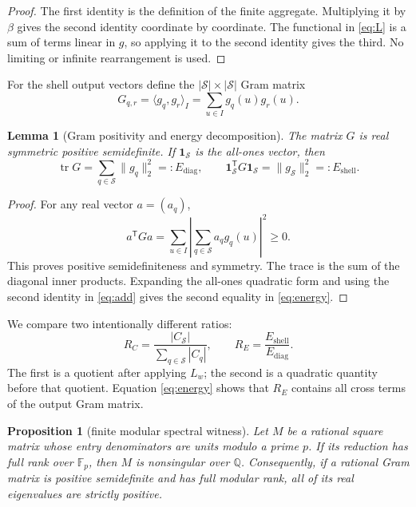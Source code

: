 \documentclass[11pt]{article}
\newtheorem{lemma}[theorem]{Lemma}
\newtheorem{proposition}[theorem]{Proposition}
\newcommand{\one}{\mathbf{1}}
\newcommand{\shell}{\mathcal S}
\newcommand{\Fp}{\mathbb F_p}
\begin{document}
\begin{proof}
The first identity is the definition of the finite aggregate.  Multiplying
it by $\beta$ gives the second identity coordinate by coordinate.  The
functional in \eqref{eq:L} is a sum of terms linear in $g$, so applying it to
the second identity gives the third.  No limiting or infinite rearrangement
is used.
\end{proof}

For the shell output vectors define the $|\shell|\times|\shell|$ Gram matrix
\begin{equation}
 G_{q,r}=\langle g_q,g_r\rangle_I
 =\sum_{u\in I}g_q(u)g_r(u).
 \label{eq:gram}
\end{equation}

\begin{lemma}[Gram positivity and energy decomposition]
The matrix $G$ is real symmetric positive semidefinite.  If $\one_{\shell}$
is the all-ones vector, then
\begin{equation}
 \operatorname{tr}G=\sum_{q\in\shell}\|g_q\|_2^2=:E_{\mathrm{diag}},
 \qquad
 \one_{\shell}^{\mathsf T}G\one_{\shell}
 =\|g_{\shell}\|_2^2=:E_{\mathrm{shell}}.
 \label{eq:energy}
\end{equation}
\end{lemma}

\begin{proof}
For any real vector $a=(a_q)$,
\begin{equation*}
 a^{\mathsf T}Ga
 =\sum_{u\in I}\left|\sum_{q\in\shell}a_qg_q(u)\right|^2\geq0.
\end{equation*}
This proves positive semidefiniteness and symmetry.  The trace is the sum of
the diagonal inner products.  Expanding the all-ones quadratic form and using
the second identity in \eqref{eq:add} gives the second equality in
\eqref{eq:energy}.
\end{proof}

We compare two intentionally different ratios:
\begin{equation}
 R_C=\frac{|C_{\shell}|}{\sum_{q\in\shell}|C_q|},
 \qquad
 R_E=\frac{E_{\mathrm{shell}}}{E_{\mathrm{diag}}}.
 \label{eq:ratios}
\end{equation}
The first is a quotient after applying $L_w$; the second is a quadratic
quantity before that quotient.  Equation \eqref{eq:energy} shows that
$R_E$ contains all cross terms of the output Gram matrix.

\begin{proposition}[finite modular spectral witness]
Let $M$ be a rational square matrix whose entry denominators are units modulo
a prime $p$.  If its reduction has full rank over $\Fp$, then $M$ is
nonsingular over $\mathbb Q$.  Consequently, if a rational Gram matrix is
positive semidefinite and has full modular rank, all of its real eigenvalues
are strictly positive.
\end{proposition}
\end{document}
